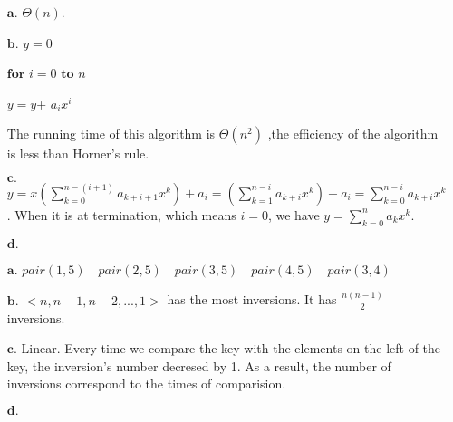 \documentclass[a4paper, justified]{tufte-handout}
\begin{document}
\begin{solution}
\begin{enumerate}
    \item [$\bm{a.}$] $\Theta(n)$.
    \item [$\bm{b.}$] $y = 0$\par
    $\bm{for}$ $i = 0$ $\bm{to}$ $n$ \par
    \hspace{2em} $y = y $+  $a_ix^{i}$\par
    The running time of this algorithm is $\Theta(n^{2})$ ,the efficiency of the algorithm is less than Horner's rule. 
    \item [$\bm{c.}$] $y = x\left(\sum_{k=0}^{n-(i+1)}{a_{k+i+1}x^{k}}\right)+a_i = \left(\sum_{k=1}^{n-i}{a_{k+i}x^{k}}\right)+a_{i} = \sum_{k=0}^{n-i}{a_{k+i}x^{k}}$.
    When it is at termination, which means $i=0$, we have $y=\sum_{k=0}^{n}{a_k}x^{k}$.
    \item [$\bm{d.}$] 
\end{enumerate}
\end{solution}

\begin{problem}[TC Problem $2-4$]
\end{problem}

\begin{solution}
\begin{enumerate}
    \item [$\bm{a.}$] $pair(1,5)\quad pair(2,5)\quad pair(3,5)\quad pair(4,5)\quad pair(3,4)$
    \item [$\bm{b.}$]  $<n,n-1,n-2,...,1>$ has the most inversions. It has $\frac{n(n-1)}{2}$ inversions.
    \item [$\bm{c.}$] Linear. Every time we compare the key with the elements on the left of the key, the inversion's number decresed by 1. As a result, the number of inversions correspond to the times of comparision.
    \item [$\bm{d.}$] 
\end{enumerate}
\end{solution}

\begin{problem}[TC Problem $3-2$]
\end{problem}
\end{document}
